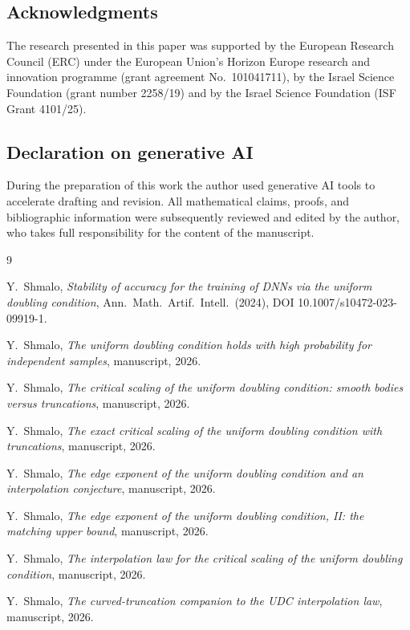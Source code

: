 \documentclass[11pt]{article}
\theoremstyle{definition}
\theoremstyle{remark}
\begin{document}
\subsection*{Acknowledgments}
The research presented in this paper was supported by the European Research
Council (ERC) under the European Union's Horizon Europe research and innovation
programme (grant agreement No.\ 101041711), by the Israel Science Foundation
(grant number 2258/19) and by the Israel Science Foundation (ISF Grant
4101/25).

\subsection*{Declaration on generative AI}
During the preparation of this work the author used generative AI tools to
accelerate drafting and revision.  All mathematical claims, proofs, and
bibliographic information were subsequently reviewed and edited by the author,
who takes full responsibility for the content of the manuscript.

\begin{thebibliography}{9}

Y.~Shmalo,
\emph{Stability of accuracy for the training of DNNs via the uniform doubling
condition}, Ann.\ Math.\ Artif.\ Intell.\ (2024),
DOI 10.1007/s10472-023-09919-1.

Y.~Shmalo, \emph{The uniform doubling condition holds with high probability
for independent samples}, manuscript, 2026.

Y.~Shmalo, \emph{The critical scaling of the uniform doubling condition:
smooth bodies versus truncations}, manuscript, 2026.

Y.~Shmalo, \emph{The exact critical scaling of the uniform doubling
condition with truncations}, manuscript, 2026.

Y.~Shmalo, \emph{The edge exponent of the uniform doubling condition and an
interpolation conjecture}, manuscript, 2026.

Y.~Shmalo, \emph{The edge exponent of the uniform doubling condition, II:
the matching upper bound}, manuscript, 2026.

Y.~Shmalo, \emph{The interpolation law for the critical scaling of the uniform
doubling condition}, manuscript, 2026.

Y.~Shmalo, \emph{The curved-truncation companion to the UDC interpolation law},
manuscript, 2026.

\end{thebibliography}
\end{document}
